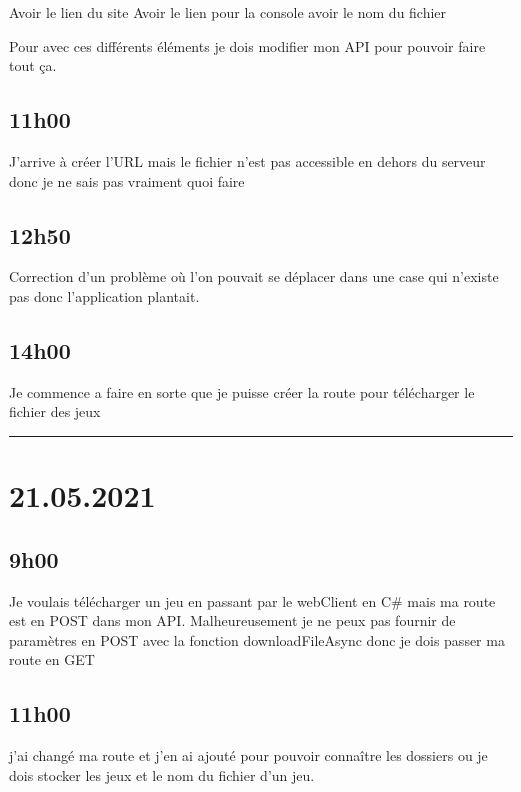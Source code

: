 \documentclass[a4paper,12pt,french]{sphinxmanual}
\begin{document}
\sphinxAtStartPar
Avoir le lien du site
Avoir le lien pour la console
avoir le nom du fichier

\sphinxAtStartPar
Pour avec ces différents éléments je dois modifier mon API pour pouvoir faire tout ça.


\subsection{11h00}
\label{\detokenize{logbook:id139}}
\sphinxAtStartPar
J’arrive à créer l’URL mais le fichier n’est pas accessible en dehors du serveur donc je ne sais pas vraiment quoi faire


\subsection{12h50}
\label{\detokenize{logbook:id140}}
\sphinxAtStartPar
Correction d’un problème où l’on pouvait se déplacer dans une case qui n’existe pas donc l’application plantait.


\subsection{14h00}
\label{\detokenize{logbook:id141}}
\sphinxAtStartPar
Je commence a faire en sorte que je puisse créer la route pour télécharger le fichier des jeux


\bigskip\hrule\bigskip



\section{21.05.2021}
\label{\detokenize{logbook:id142}}

\subsection{9h00}
\label{\detokenize{logbook:id143}}
\sphinxAtStartPar
Je voulais télécharger un jeu en passant par le webClient en C\# mais ma route est en POST dans mon API. Malheureusement je ne peux pas fournir de paramètres en POST avec la fonction downloadFileAsync donc je dois passer ma route en GET


\subsection{11h00}
\label{\detokenize{logbook:id144}}
\sphinxAtStartPar
j’ai changé ma route et j’en ai ajouté pour pouvoir connaître les dossiers ou je dois stocker les jeux et le nom du fichier d’un jeu.
\end{document}

